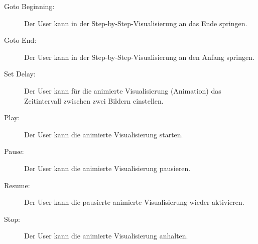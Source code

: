 \begin{description}
  \item[Goto Beginning:] Der User kann in der Step-by-Step-Visualisierung an das Ende springen.

  \item[Goto End:] Der User kann in der Step-by-Step-Visualisierung an den Anfang springen.

  \item[Set \Gls{Delay}:] Der User kann f\"ur die animierte Visualisierung (\Gls{Animation}) das Zeitintervall zwischen zwei Bildern einstellen.

  \item[Play:] Der User kann die animierte Visualisierung starten.

  \item[Pause:] Der User kann die animierte Visualisierung pausieren.

  \item[Resume:] Der User kann die pausierte animierte Visualisierung wieder aktivieren.

  \item[Stop:] Der User kann die animierte Visualisierung anhalten.
\end{description}
% 
